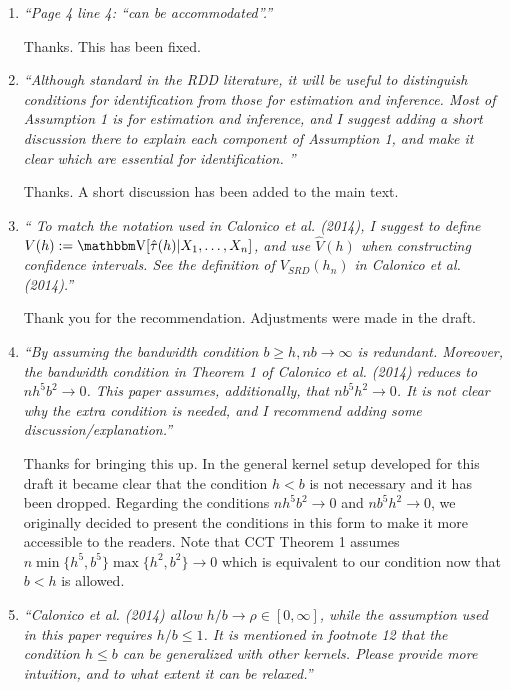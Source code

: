 \documentclass[12pt,fleqn]{article}
\begin{document}
\begin{enumerate}

 \item  \textit{``Page 4 line 4: ``can be accommodated''.''}

 Thanks. This has been fixed.

\item \textit{``Although standard in the RDD literature, it will be useful to distinguish conditions for identification from those for estimation and inference. Most of Assumption 1 is for
estimation and inference, and I suggest adding a short discussion there to explain each component of Assumption 1, and make it clear which are essential for identification. ''}

 Thanks. A short discussion has been added to the main text.
  

\item \textit{`` To match the notation used in Calonico et al. (2014), I suggest to define $V(h) :=\V[\hat{\tau}(h)|X_{1}, \dots ,X_{n}]$, and use $\hat{V}(h)$ when constructing confidence intervals. See the definition of $V_{SRD}(h_{n})$ in Calonico et al. (2014).''}

 Thank you for the recommendation. Adjustments were made in the draft.

\item \textit{``By assuming the bandwidth condition $b \geq h, nb \rightarrow \infty$ is redundant. Moreover, the bandwidth condition in Theorem 1 of Calonico et al. (2014) reduces to $nh^{5}b^{2} \rightarrow 0$. This paper assumes, additionally, that $nb^{5}h^{2} \rightarrow 0$. It is not clear why the extra condition is needed, and I recommend adding some discussion/explanation.''}

  Thanks for bringing this up. In the general kernel setup developed for this draft it became clear that the condition $h<b$ is not necessary and it has been dropped. Regarding the conditions $nh^{5}b^{2} \rightarrow 0$ and $nb^{5}h^{2} \rightarrow 0$, we originally decided to present the conditions in this form to make it more accessible to the readers. Note that CCT Theorem 1 assumes $n \min\{h^{5},b^{5}\}\max\{h^{2}, b^{2}\} \rightarrow 0$ which is equivalent to our condition now that $b < h$ is allowed.


\item \textit{``Calonico et al. (2014) allow $h/b \rightarrow \rho \in [0,\infty]$, while the assumption used in this paper requires $h/b \leq 1$. It is mentioned in footnote 12 that the condition $h \leq b$ can be generalized with other kernels. Please provide more intuition, and to what extent it can be relaxed.''}


\end{enumerate}
\end{document}
